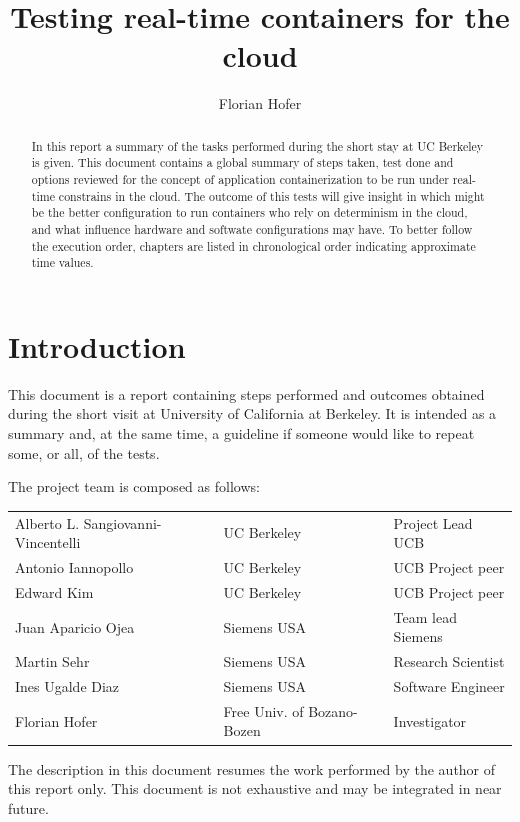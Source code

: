 \documentclass[]{scrartcl}
\title{Testing real-time containers for the cloud}
\author{Florian Hofer}
\date{}
\begin{document}
\maketitle

\begin{abstract}
	In this report a summary of the tasks performed during the short stay at UC Berkeley is given.
	This document contains a global summary of steps taken, test done and options reviewed for the concept of application containerization to be run under real-time constrains in the cloud. The outcome of this tests will give insight in which might be the better configuration to run containers who rely on determinism in the cloud, and what influence hardware and softwate configurations may have.
	To better follow the execution order, chapters are listed in chronological order indicating approximate time values.
\end{abstract}

\section{Introduction}

This document is a report containing steps performed and outcomes obtained during the short visit at University of California at Berkeley. It is intended as a summary and, at the same time, a guideline if someone would like to repeat some, or all, of the tests.

The project team is composed as follows:

\begin{table}[H]
	\begin{tabular}{l l l}
		Alberto L. Sangiovanni-Vincentelli & UC Berkeley & Project Lead UCB \\
		Antonio Iannopollo & UC Berkeley & UCB Project peer \\
		Edward Kim & UC Berkeley & UCB Project peer \\
		Juan Aparicio Ojea & Siemens USA & Team lead Siemens\\
		Martin Sehr & Siemens USA & Research Scientist\\
		Ines Ugalde Diaz & Siemens USA & Software Engineer \\
		Florian Hofer & Free Univ. of Bozano-Bozen & Investigator \\		
	\end{tabular}
\end{table}

The description in this document resumes the work performed by the author of this report only. This document is not exhaustive and may be integrated in near future.
\end{document}
